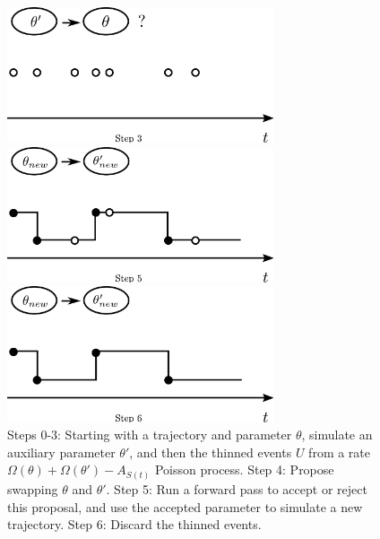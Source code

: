 \begin{figure}[H]
\begin{minipage}[hp]{0.45\linewidth}
    \includegraphics [width=0.70\textwidth, angle=0]{figs/plot3.pdf}
    \vspace{-0 in}
  \end{minipage}
  \begin{minipage}[hp]{0.45\linewidth}
  \centering
    \includegraphics [width=0.70\textwidth, angle=0]{figs/plot5.pdf}
    \vspace{-0 in}
  \end{minipage}
  \begin{minipage}[hp]{0.45\linewidth}
  \centering
    \includegraphics [width=0.70\textwidth, angle=0]{figs/plot6.pdf}
    \vspace{-0 in}
  \end{minipage}
    \caption{Steps 0-3: Starting with a trajectory and parameter $\theta$,
      simulate an auxiliary parameter $\theta'$, and then the thinned events
      $U$ from a rate $\Omega(\theta) + \Omega(\theta') - A_{S(t)}$ Poisson
      process. Step 4: Propose swapping $\theta$ and $\theta'$. Step 5:
      Run a forward pass to accept or reject this proposal, and use the accepted
    parameter to simulate a new trajectory. Step 6: Discard the thinned events.} 
   \label{fig:MH_improved}

  \end{figure}

